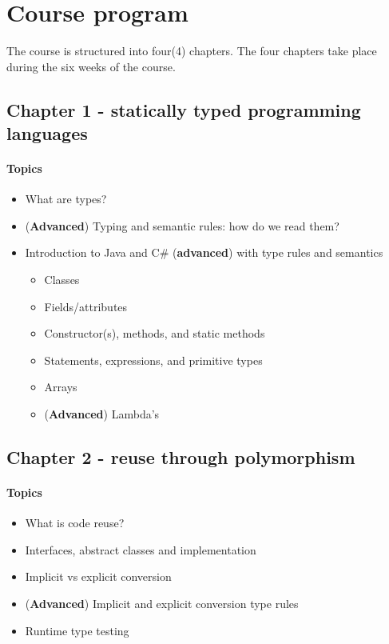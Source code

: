 \section{Course program}
The course is structured into four(4) chapters. The four chapters take place during the six weeks of the course.

\subsection{Chapter 1 - statically typed programming languages}
\paragraph*{Topics}
\begin{itemize}
	\item What are types?
	\item (\textbf{Advanced}) Typing and semantic rules: how do we read them?
	\item Introduction to Java and C\# (\textbf{advanced}) with type rules and semantics
	\begin{itemize}
		\item Classes
		\item Fields/attributes
		\item Constructor(s), methods, and static methods
		\item Statements, expressions, and primitive types
		\item Arrays
		\item (\textbf{Advanced}) Lambda's
	\end{itemize}
\end{itemize}

\subsection{Chapter 2 - reuse through polymorphism}
\paragraph*{Topics}			
\begin{itemize}
	\item What is code reuse?
	\item Interfaces, abstract classes and implementation
	\item Implicit vs explicit conversion
	\item (\textbf{Advanced}) Implicit and explicit conversion type rules
	\item Runtime type testing
\end{itemize}


